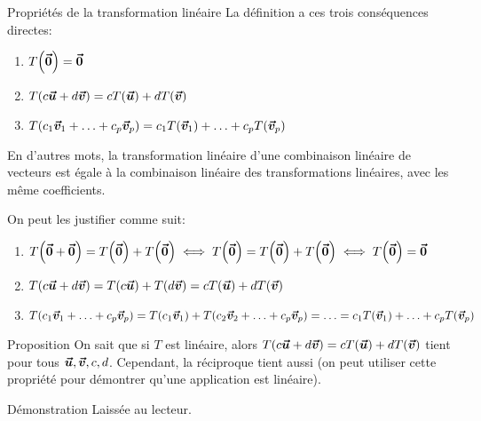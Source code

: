 \documentclass{article}
\begin{document}
\begin{parag}{Propriétés de la transformation linéaire}
    La définition a ces trois conséquences directes:
    \begin{enumerate}
        \item $T\left(\bvec{0}\right) = \bvec{0}$
        \item $T\left(c \bvec{u} + d \bvec{v}\right) = cT\left(\bvec{u}\right) + dT\left(\bvec{v}\right)$
        \item $T\left(c_1 \bvec{v}_1 + \ldots + c_p \bvec{v}_p\right) = c_1 T\left(\bvec{v}_1\right) + \ldots + c_p T\left(\bvec{v}_p\right)$
    \end{enumerate}

    En d'autres mots, la transformation linéaire d'une combinaison linéaire de vecteurs est égale à la combinaison linéaire des transformations linéaires, avec les même coefficients.

    On peut les justifier comme suit:
    \begin{enumerate}
        \item $T\left(\bvec{0} + \bvec{0}\right) = T\left(\bvec{0}\right) + T\left(\bvec{0}\right) \iff T\left(\bvec{0}\right) = T\left(\bvec{0}\right) + T\left(\bvec{0}\right) \iff T\left(\bvec{0}\right) = \bvec{0}$
        \item $T\left(c \bvec{u} + d \bvec{v}\right) = T\left(c \bvec{u}\right) + T\left(d \bvec{v}\right) = cT\left(\bvec{u}\right) + dT\left(\bvec{v}\right)$
        \item $T\left(c_1 \bvec{v}_1 + \ldots + c_p \bvec{v}_p\right) = T\left(c_1 \bvec{v}_1\right) + T\left(c_2 \bvec{v}_2 + \ldots + c_p \bvec{v}_p\right) = \ldots = c_1 T\left(\bvec{v}_1\right) + \ldots + c_p T\left(\bvec{v}_p\right)$
    \end{enumerate}
\end{parag}

\begin{parag}{Proposition}
    On sait que si $T$ est linéaire, alors $T\left(c \bvec{u} + d \bvec{v}\right) = c T\left(\bvec{u}\right) + d T\left(\bvec{v}\right)$ tient pour tous $\bm{\protect\vec{u}}, \bm{\protect\vec{v}}, c, d$. Cependant, la réciproque tient aussi (on peut utiliser cette propriété pour démontrer qu'une application est linéaire).

    \begin{subparag}{Démonstration}
        Laissée au lecteur.
    \end{subparag}

\end{parag}
\end{document}
